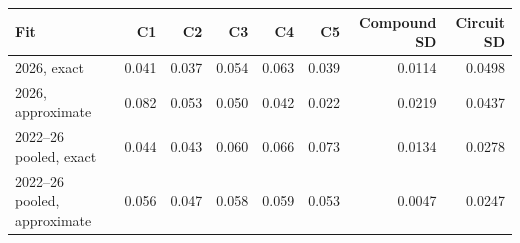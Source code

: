 \begin{tabular}{@{}lrrrrrrr@{}}
\toprule
Fit & C1 & C2 & C3 & C4 & C5 & Compound SD & Circuit SD \\
\midrule
2026, exact & 0.041 & 0.037 & 0.054 & 0.063 & 0.039 & 0.0114 & 0.0498 \\
2026, approximate & 0.082 & 0.053 & 0.050 & 0.042 & 0.022 & 0.0219 & 0.0437 \\
2022--26 pooled, exact & 0.044 & 0.043 & 0.060 & 0.066 & 0.073 & 0.0134 & 0.0278 \\
2022--26 pooled, approximate & 0.056 & 0.047 & 0.058 & 0.059 & 0.053 & 0.0047 & 0.0247 \\
\bottomrule
\end{tabular}
